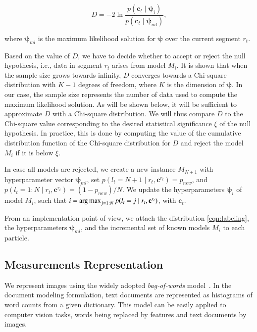 \begin{equation}
\label{eqn:statistic}
D = -2\ln\frac{p(\mathbf{c}_t\mid \boldsymbol{\psi}_i)}{p(\mathbf{c}_t\mid
\boldsymbol{\psi}_{ml})},
\end{equation}

where $\boldsymbol{\psi}_{ml}$ is the maximum likelihood solution for
$\boldsymbol{\psi}$ over the current segment $r_t$.

Based on the value of $D$, we have to decide whether to accept or reject the
null hypothesis, i.e., data in segment $r_t$ arises from model $M_i$. It is
shown that when the sample size grows towards infinity, $D$ converges towards a
Chi-square distribution with $K-1$ degrees of freedom, where $K$ is the
dimension of $\boldsymbol{\psi}$. In our case, the sample size represents the
number of data used to compute the maximum likelihood solution. As will be
shown below, it will be sufficient to approximate $D$ with a Chi-square
distribution. We will thus compare $D$ to the Chi-square value corresponding to
the desired statistical significance $\xi$ of the null hypothesis. In practice,
this is done by computing the value of the cumulative distribution
function of the Chi-square distribution for $D$ and reject the model
$M_i$ if it is below $\xi$.

In case all models are rejected, we create a new instance $M_{N+1}$
with hyperparameter vector $\boldsymbol{\psi}_{ml}$, set $p(l_t=N+1\mid r_t,
\mathbf{c}^{r_t})=p_{new}$, and $p(l_t=1:N\mid r_t,\mathbf{c}^{r_t})=
(1-p_{new})/N$. We update the hyperparameters $\boldsymbol{\psi}_i$ of model
$M_i$, such that $i=\operatorname*{arg\,max}_{j=1:N}p(l_t=j\mid
r_t,\mathbf{c}^{r_t})$, with $\mathbf{c}_t$.

From an implementation point of view, we attach the distribution
\eqref{eqn:labeling}, the hyperparameters $\boldsymbol{\psi}_{ml}$, and the
incremental set of known models $M_i$ to each particle.

\subsection{Measurements Representation}
We represent images using the widely adopted \emph{bag-of-words}
model~\cite{sivic03video}. In the document modeling formulation, text documents
are represented as histograms of word counts from a given dictionary. This model
can be easily applied to computer vision tasks, words being replaced by features
and text documents by images.

